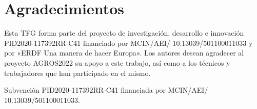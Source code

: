 \chapter{Agradecimientos}
Esta TFG  forma parte del proyecto de investigación, desarrollo e innovación PID2020-117392RR-C41 financiado por MCIN/AEI/ 10.13039/501100011033 y por «ERDF Una manera de hacer Europa». Los autores desean agradecer al proyecto AGROS2022 su apoyo a este trabajo, así como a los técnicos y trabajadores que han participado en el mismo.
 
 
Subvención PID2020-117392RR-C41 financiada por MCIN/AEI/ 10.13039/501100011033.
